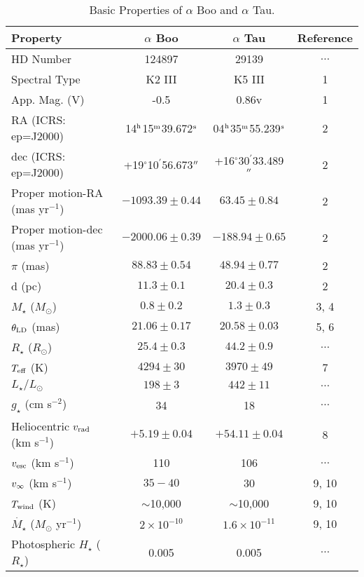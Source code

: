 \begin{table}[!hb]\small
\begin{center}
\caption[Basic Properties of $\alpha$ Boo and $\alpha$ Tau.]
{Basic Properties of $\alpha$ Boo and $\alpha$ Tau.}
\begin{tabular}{lccc}
\hline
\hline
\rule{0pt}{2.5ex}Property & $\alpha$ Boo & $\alpha$ Tau & Reference\\
\hline
\rule{0pt}{2.5ex}HD Number & 124897 & 29139 & $\ldots$\\
Spectral Type & K2 III & K5 III& 1\\ 
App. Mag. (V) & -0.5 & 0.86v & 1\\
RA (ICRS: ep=J2000)&14$^{\rm{h}}$15$^{\rm{m}}$39.672$^{\rm{s}}$&04$^{\rm{h}}$35$^{\rm{m}}$55.239$^{\rm{s}}$&2\\
dec (ICRS: ep=J2000) & +19$^{\circ}$10$^{\prime}$56.673$^{\prime\prime}$ & +16$^{\circ}$30$^{\prime}$33.489$^{\prime\prime}$ & 2 \\
Proper motion-RA (mas yr$^{-1}$)& $-1093.39 \pm 0.44$ & $63.45\pm 0.84$  & 2 \\
Proper motion-dec (mas yr$^{-1}$)& $-2000.06 \pm 0.39$ & $-188.94\pm 0.65$ & 2 \\
$\pi$ (mas)& $88.83\pm 0.54$ & $48.94\pm 0.77$& 2\\
d (pc)& $11.3 \pm 0.1$ & $20.4 \pm 0.3$& 2\\
$M_{\star}$ ($M_{\odot}$) & $0.8 \pm 0.2$ & $1.3 \pm 0.3$& 3, 4 \\
$\theta _{\rm{LD}}$ (mas)& $21.06\pm 0.17$ & $20.58 \pm 0.03$& 5, 6 \\
$R_{\star}$ ($R_{\odot}$)& $25.4 \pm 0.3$ & $44.2 \pm 0.9$ & $\ldots$ \\
$T_{\rm{eff}}$ (K) & $4294 \pm 30$ & $3970 \pm 49$& 7 \\
$L_{\star}/L_{\odot}$&$198 \pm 3$ &$442\pm 11$ & $\ldots$\\
$g_{\star}$ (cm s$^{-2}$)& 34& 18&$\ldots$\\
Heliocentric $v_{\rm{rad}}$ (km s$^{-1}$) & $+5.19 \pm 0.04$ & $+54.11\pm 0.04$ & 8\\
$v_{\rm{esc}}$ (km s$^{-1}$) &110 & 106& $\ldots$\\
$v_{\rm{\infty}}$ (km s$^{-1}$)& $35-40$ & 30& 9, 10\\
$T_{\rm{wind}}$ (K)& $\sim$10,000 & $\sim$10,000 & 9, 10\\
$\dot{M_{\star}}$ ($M_{\odot}$ yr$^{-1}$)& $2\times 10^{-10}$& $1.6\times 10^{-11}$& 9, 10\\
Photospheric $H_{\star}$ ($R_{\star}$)& 0.005& 0.005& $\ldots$\\

\end{tabular}
\end{center}
\end{table}
